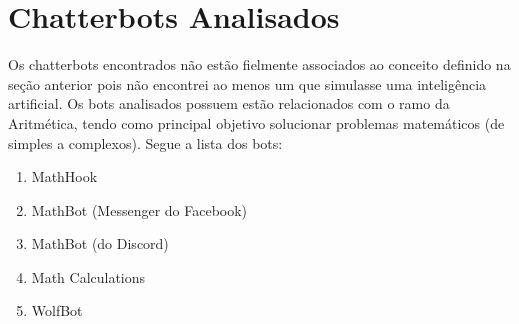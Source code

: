 \section{Chatterbots Analisados}\label{sec:chatterbots_analisados} %
Os chatterbots encontrados não estão fielmente associados ao conceito definido na seção anterior pois não encontrei ao menos um que simulasse uma inteligência artificial. Os bots analisados possuem estão relacionados com o ramo da Aritmética, tendo como principal objetivo solucionar problemas matemáticos (de simples a complexos). Segue a lista dos bots:
\begin{enumerate}
    \item MathHook
    \item MathBot  (Messenger do Facebook)
    \item MathBot  (do Discord)
    \item Math Calculations
    \item WolfBot 
\end{enumerate}